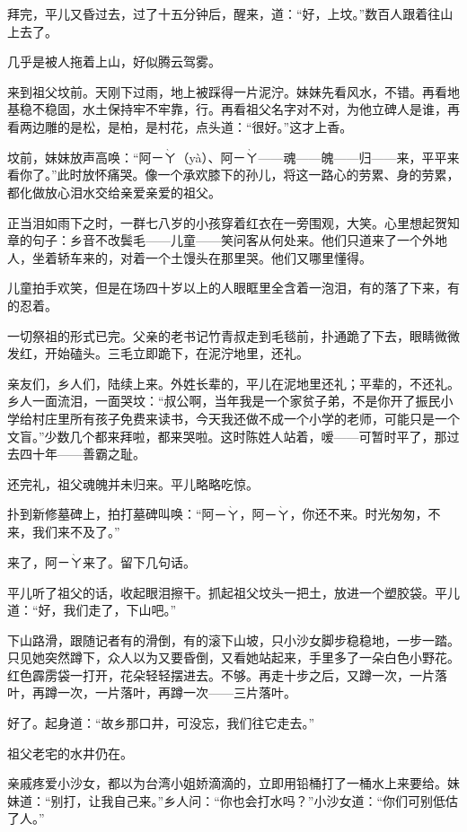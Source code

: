 \par 拜完，平儿又昏过去，过了十五分钟后，醒来，道：“好，上坟。”数百人跟着往山上去了。
\par 几乎是被人拖着上山，好似腾云驾雾。
\par 来到祖父坟前。天刚下过雨，地上被踩得一片泥泞。妹妹先看风水，不错。再看地基稳不稳固，水土保持牢不牢靠，行。再看祖父名字对不对，为他立碑人是谁，再看两边雕的是松，是柏，是村花，点头道：“很好。”这才上香。
\par 坟前，妹妹放声高唤：“阿$\text{ㄧ}\grave{\text{ㄚ}}$（yà）、阿$\text{ㄧ}\grave{\text{ㄚ}}$——魂——魄——归——来，平平来看你了。”此时放怀痛哭。像一个承欢膝下的孙儿，将这一路心的劳累、身的劳累，都化做放心泪水交给亲爱亲爱的祖父。
\par 正当泪如雨下之时，一群七八岁的小孩穿着红衣在一旁围观，大笑。心里想起贺知章的句子：乡音不改鬓毛——儿童——笑问客从何处来。他们只道来了一个外地人，坐着轿车来的，对着一个土馒头在那里哭。他们又哪里懂得。
\par 儿童拍手欢笑，但是在场四十岁以上的人眼眶里全含着一泡泪，有的落了下来，有的忍着。
\par 一切祭祖的形式已完。父亲的老书记竹青叔走到毛毯前，扑通跪了下去，眼睛微微发红，开始磕头。三毛立即跪下，在泥泞地里，还礼。
\par 亲友们，乡人们，陆续上来。外姓长辈的，平儿在泥地里还礼；平辈的，不还礼。乡人一面流泪，一面哭坟：“叔公啊，当年我是一个家贫子弟，不是你开了振民小学给村庄里所有孩子免费来读书，今天我还做不成一个小学的老师，可能只是一个文盲。”少数几个都来拜啦，都来哭啦。这时陈姓人站着，嗳——可暂时平了，那过去四十年——善霸之耻。
\par 还完礼，祖父魂魄并未归来。平儿略略吃惊。
\par 扑到新修墓碑上，拍打墓碑叫唤：“阿$\text{ㄧ}\grave{\text{ㄚ}}$，阿$\text{ㄧ}\grave{\text{ㄚ}}$，你还不来。时光匆匆，不来，我们来不及了。”
\par 来了，阿$\text{ㄧ}\grave{\text{ㄚ}}$来了。留下几句话。
\par 平儿听了祖父的话，收起眼泪擦干。抓起祖父坟头一把土，放进一个塑胶袋。平儿道：“好，我们走了，下山吧。”
\par 下山路滑，跟随记者有的滑倒，有的滚下山坡，只小沙女脚步稳稳地，一步一踏。只见她突然蹲下，众人以为又要昏倒，又看她站起来，手里多了一朵白色小野花。红色霹雳袋一打开，花朵轻轻摆进去。不够。再走十步之后，又蹲一次，一片落叶，再蹲一次，一片落叶，再蹲一次——三片落叶。
\par 好了。起身道：“故乡那口井，可没忘，我们往它走去。”
\par 祖父老宅的水井仍在。
\par 亲戚疼爱小沙女，都以为台湾小姐娇滴滴的，立即用铅桶打了一桶水上来要给。妹妹道：“别打，让我自己来。”乡人问：“你也会打水吗？”小沙女道：“你们可别低估了人。”
